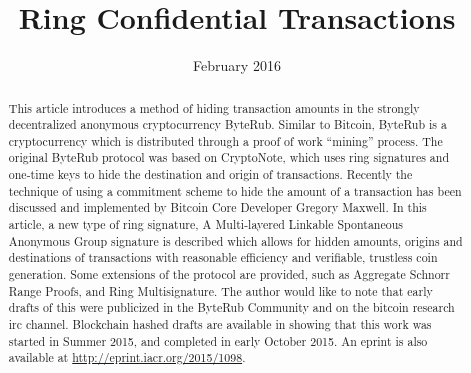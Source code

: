 \documentclass[12pt,english]{mrl}
\theoremstyle{definition}
\numberwithin{equation}{section}
\numberwithin{figure}{section}
\numberwithin{equation}{section}
\numberwithin{equation}{section}
\numberwithin{figure}{section}
\begin{document}
\begin{frontmatter}

\begin{fmbox}
\hfill\setlength{\fboxrule}{0px}\setlength{\fboxsep}{5px}
\title{Ring Confidential Transactions}
\date{February 2016}
\author[
   addressref={mrl},
   email={lab@getmonero.org   shen.noether@gmx.com}
]{ }
\author[
   addressref={mrl},
   email={lab@getmonero.org}
]{ }
\author[
   addressref={mrl},
   email={lab@getmonero.org}
]{}

\address[id=mrl]{
}\end{fmbox}


\begin{abstractbox}
\begin{abstract}
This article introduces a method of hiding transaction amounts in
the strongly decentralized anonymous cryptocurrency ByteRub. Similar
to Bitcoin, ByteRub is a cryptocurrency which is distributed through
a proof of work ``mining'' process. The original ByteRub protocol
was based on CryptoNote, which uses ring signatures and one-time keys
to hide the destination and origin of transactions. Recently the technique
of using a commitment scheme to hide the amount of a transaction has
been discussed and implemented by Bitcoin Core Developer Gregory Maxwell.
In this article, a new type of ring signature, A Multi-layered Linkable
Spontaneous Anonymous Group signature is described which allows for hidden
amounts, origins and destinations of transactions with reasonable
efficiency and verifiable, trustless coin generation. Some extensions of the protocol are provided, such as Aggregate Schnorr Range Proofs, and Ring Multisignature. The author would like to note that early drafts of this were publicized in the ByteRub Community and on the bitcoin research irc channel. Blockchain hashed drafts are available in \cite{Snoe} showing that this work was started in Summer 2015, and completed in early October 2015. An eprint is also available at \url{http://eprint.iacr.org/2015/1098}.
\end{abstract}
\end{abstractbox}

\end{frontmatter}

\end{document}
